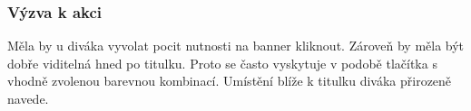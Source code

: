     \subsubsection{Výzva k akci}
    Měla by u diváka vyvolat pocit nutnosti na banner kliknout. Zároveň by měla být dobře viditelná hned po titulku.
    Proto se často vyskytuje v podobě tlačítka s vhodně zvolenou barevnou kombinací.
    Umístění blíže k titulku diváka přirozeně navede.


\endinput